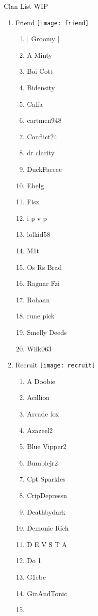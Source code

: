\documentclass{article}
\begin{document}
Clan List WIP
\begin{enumerate}[I]
  \item 
    Friend \texttt{[image: friend]}
    \begin{enumerate}[I]
      \item
	| Groomy |
      \item
	A Minty
      \item
	Boi Cott
      \item
	Bidensity
      \item
	Calfa
      \item
	cartmen948
      \item
	Conflict24
      \item
	dr clarity
      \item
	DuckFaceee
      \item
	Ebelg
      \item
	Fisz
      \item
	i p v p
      \item
	lolkid58
      \item
	M1t
      \item
	Os Rs Brad
      \item
	Ragnar Fzi
      \item
	Rohaan
      \item
	rune pick
      \item
	Smelly Deeds
      \item
	Wilk063
    \end{enumerate}
  \item
    Recruit \texttt{[image: recruit]}
    \begin{enumerate}[I]
      \item
	A Doobie
      \item 
	Acillion
      \item
	Arcade fox
      \item
	Azazeel2
      \item
	Blue Vipper2
      \item
	Bumblejr2
      \item
	Cpt Sparkles
      \item
	CripDepressn
      \item
	Deathbydark
      \item
	Demonic Rich
      \item
	D E V S T A
      \item
	Do 1
      \item
	G1ebe
      \item
	GinAndTonic
      \item

\end{enumerate}
\end{enumerate}
\end{document}
